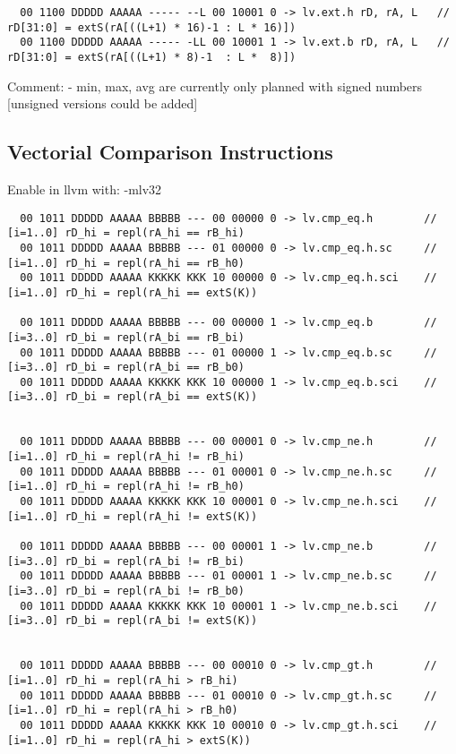 \begin{landscape}
\begin{verbatim}
  00 1100 DDDDD AAAAA ----- --L 00 10001 0 -> lv.ext.h rD, rA, L   // rD[31:0] = extS(rA[((L+1) * 16)-1 : L * 16)])
  00 1100 DDDDD AAAAA ----- -LL 00 10001 1 -> lv.ext.b rD, rA, L   // rD[31:0] = extS(rA[((L+1) * 8)-1  : L *  8)])
\end{verbatim}



Comment:
    - min, max, avg are currently only planned with signed numbers [unsigned versions could be added]


\newpage
\subsection{Vectorial Comparison Instructions}
Enable in llvm with: -mlv32

\begin{verbatim}
  00 1011 DDDDD AAAAA BBBBB --- 00 00000 0 -> lv.cmp_eq.h        // [i=1..0] rD_hi = repl(rA_hi == rB_hi)
  00 1011 DDDDD AAAAA BBBBB --- 01 00000 0 -> lv.cmp_eq.h.sc     // [i=1..0] rD_hi = repl(rA_hi == rB_h0)
  00 1011 DDDDD AAAAA KKKKK KKK 10 00000 0 -> lv.cmp_eq.h.sci    // [i=1..0] rD_hi = repl(rA_hi == extS(K))

  00 1011 DDDDD AAAAA BBBBB --- 00 00000 1 -> lv.cmp_eq.b        // [i=3..0] rD_bi = repl(rA_bi == rB_bi)
  00 1011 DDDDD AAAAA BBBBB --- 01 00000 1 -> lv.cmp_eq.b.sc     // [i=3..0] rD_bi = repl(rA_bi == rB_b0)
  00 1011 DDDDD AAAAA KKKKK KKK 10 00000 1 -> lv.cmp_eq.b.sci    // [i=3..0] rD_bi = repl(rA_bi == extS(K))


  00 1011 DDDDD AAAAA BBBBB --- 00 00001 0 -> lv.cmp_ne.h        // [i=1..0] rD_hi = repl(rA_hi != rB_hi)
  00 1011 DDDDD AAAAA BBBBB --- 01 00001 0 -> lv.cmp_ne.h.sc     // [i=1..0] rD_hi = repl(rA_hi != rB_h0)
  00 1011 DDDDD AAAAA KKKKK KKK 10 00001 0 -> lv.cmp_ne.h.sci    // [i=1..0] rD_hi = repl(rA_hi != extS(K))

  00 1011 DDDDD AAAAA BBBBB --- 00 00001 1 -> lv.cmp_ne.b        // [i=3..0] rD_bi = repl(rA_bi != rB_bi)
  00 1011 DDDDD AAAAA BBBBB --- 01 00001 1 -> lv.cmp_ne.b.sc     // [i=3..0] rD_bi = repl(rA_bi != rB_b0)
  00 1011 DDDDD AAAAA KKKKK KKK 10 00001 1 -> lv.cmp_ne.b.sci    // [i=3..0] rD_bi = repl(rA_bi != extS(K))


  00 1011 DDDDD AAAAA BBBBB --- 00 00010 0 -> lv.cmp_gt.h        // [i=1..0] rD_hi = repl(rA_hi > rB_hi)
  00 1011 DDDDD AAAAA BBBBB --- 01 00010 0 -> lv.cmp_gt.h.sc     // [i=1..0] rD_hi = repl(rA_hi > rB_h0)
  00 1011 DDDDD AAAAA KKKKK KKK 10 00010 0 -> lv.cmp_gt.h.sci    // [i=1..0] rD_hi = repl(rA_hi > extS(K))


\end{verbatim}
\end{landscape}
